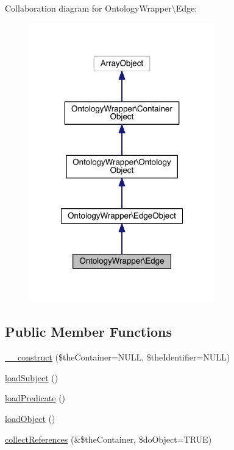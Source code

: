 Collaboration diagram for Ontology\-Wrapper\textbackslash{}Edge\-:
\nopagebreak
\begin{figure}[H]
\begin{center}
\leavevmode
\includegraphics[width=228pt]{class_ontology_wrapper_1_1_edge__coll__graph}
\end{center}
\end{figure}
\subsection*{Public Member Functions}
\begin{DoxyCompactItemize}
\item 
\hyperlink{class_ontology_wrapper_1_1_edge_ae3ae5e6b59244535718879a98e4b16d3}{\-\_\-\-\_\-construct} (\$the\-Container=N\-U\-L\-L, \$the\-Identifier=N\-U\-L\-L)
\item 
\hyperlink{class_ontology_wrapper_1_1_edge_acd4c7e465ef4a809580d6ad8d19dd7ab}{load\-Subject} ()
\item 
\hyperlink{class_ontology_wrapper_1_1_edge_ab4ec3c0a5b1b89632c20c5d807e13da9}{load\-Predicate} ()
\item 
\hyperlink{class_ontology_wrapper_1_1_edge_ac0176e2db533a781fb59c60368e3f5e4}{load\-Object} ()
\item 
\hyperlink{class_ontology_wrapper_1_1_edge_aaf586277ed281c7303c4f7fafec2b7ac}{collect\-References} (\&\$the\-Container, \$do\-Object=T\-R\-U\-E)
\end{DoxyCompactItemize}
